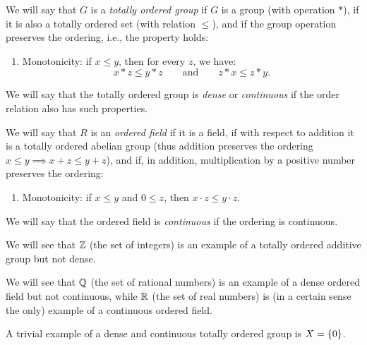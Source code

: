 \begin{definition}
  \label{def:gruppo_ordinato}%
  \label{def:campo_ordinato}%
  We will say that $G$ is a \emph{totally ordered group}
%
% 
    if $G$ is a group (with operation $*$), if it is also a totally ordered set
  (with relation $\le$), and if the group operation preserves the ordering,
  i.e., the property holds:
  \begin{enumerate}
    \item[1.] Monotonicity:
    if $x\le y$, then for every $z$, we have:
      \[
      x*z \le y*z \qquad\text{and}\qquad z*x \le z*y.
      \] 
  \end{enumerate}
    We will say that the totally ordered group is \emph{dense} or
  \emph{continuous} if the order relation also has such properties.

  We will say that $R$ is an \emph{ordered field}
%
%
    if it is a field, if with respect to addition it is a totally ordered
  abelian group (thus addition preserves the ordering $x\le y \implies x+z\le
  y+z$), and if, in addition, multiplication by a positive number preserves the
  ordering:
  \begin{enumerate}
    \item[2.] Monotonicity: 
    if $x\le y$ and $0\le z$, then $x\cdot z \le y\cdot z$. 
  \end{enumerate} 

    We will say that the ordered field is \emph{continuous} if the ordering is
  continuous.
\end{definition}

\begin{example}
We will see that ${\mathbb Z}$ (the set of integers) is an example of a totally ordered
additive group but not dense.
\end{example}

\begin{example}
We will see that ${\mathbb Q}$ (the set of rational numbers) is an example of a dense
ordered field but not continuous, while ${\mathbb R}$ (the set of real numbers) is (in a
certain sense the only) example of a continuous ordered field.
\end{example}

\begin{example}
A trivial example of a dense and continuous totally ordered group is
$X={\left\{ 0 \right\}}$.
\end{example}

